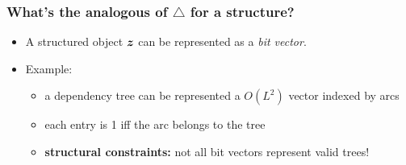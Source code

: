 \begin{frame}%
\frametitle{What's the analogous of $\triangle$ for a structure?}%

\begin{itemize}
\item A structured object $\boldsymbol{z}$ can be represented as a \emph{bit vector}.
\item<2-> Example:
\begin{itemize}
\item<2-> a dependency tree can be represented a $O(L^2)$ vector indexed by arcs
\item<2-> each entry is 1 iff the arc belongs to the tree
\item<2-> {\bf structural constraints:} not all bit vectors represent valid trees!
\end{itemize}
\end{itemize}

\bigskip


\end{frame}%

